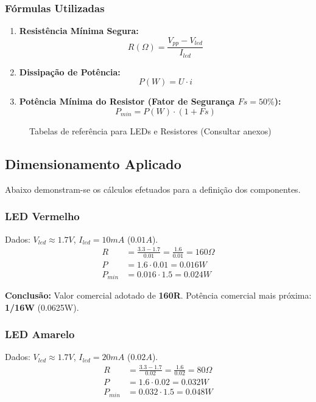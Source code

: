 \documentclass[12pt,a4paper]{article}
\begin{document}
	\subsubsection{Fórmulas Utilizadas}
	\begin{enumerate}
		\item \textbf{Resistência Mínima Segura:}
		\[ R(\Omega) = \frac{V_{pp} - V_{led}}{I_{led}} \]
		
		\item \textbf{Dissipação de Potência:}
		\[ P(W) = U \cdot i \]
		
		\item \textbf{Potência Mínima do Resistor (Fator de Segurança $Fs = 50\%$):}
		\[ P_{min} = P(W) \cdot (1 + Fs) \]
	\end{enumerate}
	
	\begin{figure}[H]
		\centering
		\caption{Tabelas de referência para LEDs e Resistores (Consultar anexos)}
	\end{figure}
	
	\subsection{Dimensionamento Aplicado}
	
	Abaixo demonstram-se os cálculos efetuados para a definição dos componentes.
	
	\subsubsection{LED Vermelho}
	Dados: $V_{led} \approx 1.7V$, $I_{led} = 10mA$ ($0.01A$).
	\begin{align*}
		R &= \frac{3.3 - 1.7}{0.01} = \frac{1.6}{0.01} = 160\Omega \\
		P &= 1.6 \cdot 0.01 = 0.016W \\
		P_{min} &= 0.016 \cdot 1.5 = 0.024W
	\end{align*}
	
	\textbf{Conclusão:} Valor comercial adotado de \textbf{160R}.
	Potência comercial mais próxima: \textbf{1/16W} (0.0625W).
	
	\subsubsection{LED Amarelo}
	Dados: $V_{led} \approx 1.7V$, $I_{led} = 20mA$ ($0.02A$).
	\begin{align*}
		R &= \frac{3.3 - 1.7}{0.02} = \frac{1.6}{0.02} = 80\Omega \\
		P &= 1.6 \cdot 0.02 = 0.032W \\
		P_{min} &= 0.032 \cdot 1.5 = 0.048W
	\end{align*}
	
\end{document}
